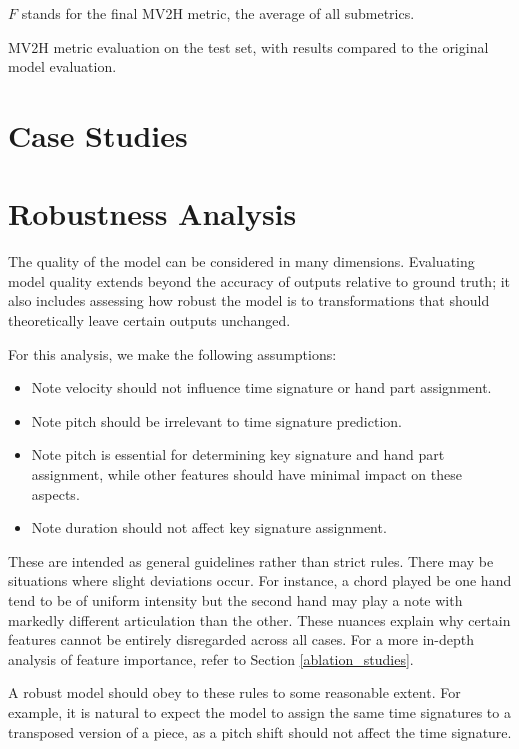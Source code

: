 $F$ stands for the final MV2H metric, the average of all submetrics.

\begin{table}[ht!]
\centering

\caption[MV2H metric evaluation on the test set.]{MV2H metric evaluation on the test set, with results compared to the original model evaluation.}
\end{table}

\section{Case Studies}

\missing

\section{Robustness Analysis} \label{robustness_analysis}

The quality of the model can be considered in many dimensions. Evaluating model quality extends beyond the accuracy of outputs relative to ground truth; it also includes assessing how robust the model is to transformations that should theoretically leave certain outputs unchanged.

For this analysis, we make the following assumptions: \begin{itemize} \item Note velocity should not influence time signature or hand part assignment. \item Note pitch should be irrelevant to time signature prediction. \item Note pitch is essential for determining key signature and hand part assignment, while other features should have minimal impact on these aspects. \item Note duration should not affect key signature assignment. \end{itemize} These are intended as general guidelines rather than strict rules. There may be situations where slight deviations occur. For instance, a chord played be one hand tend to be of uniform intensity but the second hand may play a note with markedly different articulation than the other. These nuances explain why certain features cannot be entirely disregarded across all cases. For a more in-depth analysis of feature importance, refer to Section \ref{ablation_studies}.

A robust model should obey to these rules to some reasonable extent. For example, it is natural  to expect the model to assign the same time signatures to a transposed version of a piece, as a pitch shift should not affect the time signature.

